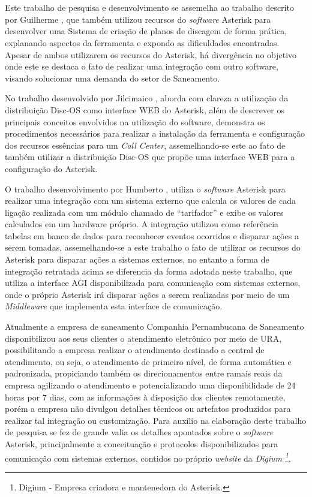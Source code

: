 \section{\fontsize{12}{1} }
Este trabalho de pesquisa e desenvolvimento se assemelha ao trabalho descrito por Guilherme \cite{VIEIRA:2007}, que também utilizou recursos do \textit{software} Asterisk para desenvolver uma Sistema de criação de planos de discagem de forma prática, explanando aspectos da ferramenta e expondo as dificuldades encontradas. Apesar de ambos utilizarem os recursos do Asterisk, há divergência no objetivo onde este se destaca o fato de realizar uma integração com outro software, visando solucionar uma demanda do setor de Saneamento.

No trabalho desenvolvido por Jilcimaico \cite{DARU:2008}, aborda com clareza a utilização da distribuição Disc-OS como interface WEB do Asterisk, além de descrever os principais conceitos envolvidos na utilização do software, demonstra os procedimentos necessários para realizar a instalação da ferramenta e configuração dos recursos essências para um \textit{Call Center}, assemelhando-se este ao fato de também utilizar a distribuição Disc-OS que propõe uma interface WEB para a configuração do Asterisk.

O trabalho desenvolvimento por Humberto \cite{CAMPOS:2007}, utiliza o \textit{software} Asterisk para realizar uma integração com um sistema externo que calcula os valores de cada ligação realizada com um módulo chamado de “tarifador” e exibe os valores calculados em um hardware próprio. A integração utilizou como referência tabelas em banco de dados para reconhecer eventos ocorridos e disparar ações a serem tomadas, assemelhando-se a este trabalho o fato de utilizar os recursos do Asterisk para disparar ações a sistemas externos, no entanto a forma de integração retratada acima se diferencia da forma adotada neste trabalho, que utiliza a interface AGI disponibilizada para comunicação com sistemas externos, onde o próprio Asterisk irá disparar ações a serem realizadas por meio de um \textit{Middleware} que implementa esta interface de comunicação.

Atualmente a empresa de saneamento Companhia Pernambucana de Saneamento \cite{COMPESA:URA} disponibilizou aos seus clientes o atendimento eletrônico por meio de URA, possibilitando a empresa realizar o atendimento destinado a central de atendimento, ou seja, o atendimento de primeiro nível, de forma automática e padronizada, propiciando também os direcionamentos entre ramais reais da empresa agilizando o atendimento e potencializando uma disponibilidade de 24 horas por 7 dias, com as informações à disposição dos clientes remotamente, porém a empresa não divulgou detalhes técnicos ou artefatos produzidos para realizar tal integração ou customização.
Para auxílio na elaboração deste trabalho de pesquisa se fez de grande valia os detalhes apontados sobre o \textit{software} Asterisk, principalmente a conceituação e protocolos disponibilizados para comunicação com sistemas externos, contidos no próprio \textit{website} da \textit{Digium \footnote{Digium - Empresa criadora e mantenedora do Asterisk.}}. 
